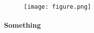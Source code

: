 \documentclass[b5paper]{scrbook}
\begin{document}
	
	\tableofcontents
	
	\afterpage{\clearpage}
	\begin{sidewaysfigure}[ht]
		\texttt{[image: figure.png]}
		\label{fig:LandscapeFigure}
	\end{sidewaysfigure}
	
	\begin{addmargin}[-1cm]{-2cm}
		\colorbox{Snow2}{
			\begin{minipage}[t]{\linewidth}%
				
				\paragraph{Something}
				\lipsum[1]
			\end{minipage}
		}	
	\end{addmargin}
\end{document}
